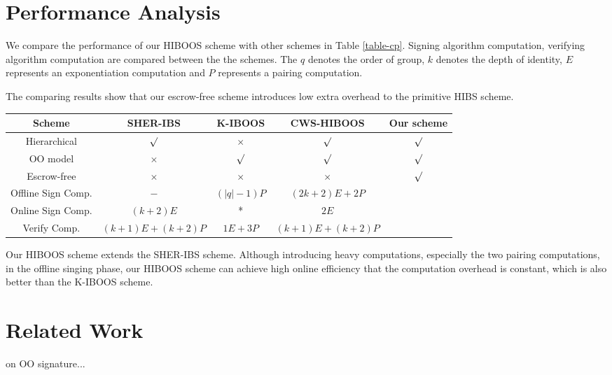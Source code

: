 \documentclass[times]{secauth}
\theoremstyle{definition}
\theoremstyle{remark}
\begin{document}
\section{Performance Analysis}\label{sec-Performance}
We compare the performance of our HIBOOS scheme with other schemes in Table \ref{table-cp}. 
Signing algorithm computation, verifying algorithm computation are compared between the the schemes.
The $q$ denotes the order of group, $k$ denotes the depth of identity, $E$ represents an exponentiation computation and $P$ represents a pairing computation.\par
The comparing results show that our escrow-free scheme introduces low extra overhead to the primitive HIBS scheme.  
\par

\begin{table*}
\centering
\caption{\label{table-cp} Comparison of different schemes (* The computation overhead depends on the value a random  $\beta \in \mathbb{Z}^*_q$, which up to $\left|q\right| -1$)}
\begin{tabular}{|c|c|c|c|c|}
\hline
Scheme &SHER-IBS \cite{chow2004secure} &K-IBOOS \cite{kar2014provably} &CWS-HIBOOS \cite{anescrowfree2015chen} &Our scheme\\
\hline
\hline
Hierarchical &$\surd$ &$\times$ &$\surd$ &$\surd$\\
\hline
OO model	&$\times$ &$\surd$ &$\surd$ &$\surd$\\
\hline
Escrow-free	&$\times$ &$\times$ &$\times$ &$\surd$\\
\hline
Offline Sign Comp. &$-$ &$(\left| q\right| -1)P$ &$(2k+2)E+2P$ & \\
\hline
Online Sign Comp. &$(k+2)E$ &* &$2E$ & \\
\hline
Verify Comp.	&$(k+1)E+(k+2)P$ &$1E+3P$ &$(k+1)E+(k+2)P$ & \\
\hline
\end{tabular}
\end{table*}

Our HIBOOS scheme extends the SHER-IBS scheme. 
Although introducing heavy computations, especially the two pairing computations, in the offline singing phase, our HIBOOS scheme can achieve high online efficiency that the computation overhead is constant, which is also better than the K-IBOOS scheme.

\section{Related Work} \label{sec-relatedwork}
on OO signature...
\par
\end{document}
